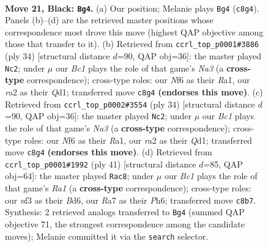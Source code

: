 \documentclass[11pt]{article}
\begin{document}
\clearpage

\begin{figure}[p]\centering
\begin{subfigure}{0.46\textwidth}\centering
\resizebox{\linewidth}{!}{%
\newchessgame
\chessboard[
  setfen={2b1r1k1/r3qpp1/np1p1n2/4p2p/P1B1P3/2N2NP1/R1PQ1P1P/2R3K1 b - - 4 21},
  showmover=false,
  pgfstyle=straightmove, color=movearrow, markmove={c8-g4}
]}
\caption{}
\end{subfigure}\hfill
\begin{subfigure}{0.46\textwidth}\centering
\resizebox{\linewidth}{!}{%
\newchessgame
\chessboard[
  setfen={r2qr1k1/4nppp/pp3n2/3p4/2PP4/NP3N1P/5PP1/R2QR1K1 w - - 0 18},
  showmover=false,
  pgfstyle=straightmove, color=movearrow, markmove={a3-c2}
]}
\caption{}
\end{subfigure}
\\[4pt]
\begin{subfigure}{0.46\textwidth}\centering
\resizebox{\linewidth}{!}{%
\newchessgame
\chessboard[
  setfen={r2qr1k1/4nppp/pp3n2/3p4/2PP4/NP3N1P/5PP1/R2QR1K1 w - - 0 18},
  showmover=false,
  pgfstyle=straightmove, color=movearrow, markmove={a3-c2}
]}
\caption{}
\end{subfigure}\hfill
\begin{subfigure}{0.46\textwidth}\centering
\resizebox{\linewidth}{!}{%
\newchessgame
\chessboard[
  setfen={r2rq1k1/1p3pp1/p1nb1n1p/4p3/1P2P3/PQ3N1P/1B1N1PP1/2R1R1K1 b - - 7 21},
  showmover=false,
  pgfstyle=straightmove, color=movearrow, markmove={a8-c8}
]}
\caption{}
\end{subfigure}
\caption{\textbf{Move 21, Black: \texttt{Bg4}.} (a) Our position; Melanie plays \texttt{Bg4} (\texttt{c8g4}). Panels (b)--(d) are the retrieved master positions whose correspondence most drove this move (highest QAP objective among those that transfer to it). (b) Retrieved from \texttt{ccrl\_top\_p0001\#3886} (ply 34) [structural distance $d$=90, QAP obj=36]: the master played \texttt{Nc2}; under $\mu$ our \emph{Bc1} plays the role of that game's \emph{Na3} (a \textbf{cross-type} correspondence); cross-type roles: our \emph{N}f6 as their \emph{R}a1, our \emph{r}a2 as their \emph{Q}d1; transferred move \texttt{c8g4} \textbf{(endorses this move)}. (c) Retrieved from \texttt{ccrl\_top\_p0002\#3554} (ply 34) [structural distance $d$=90, QAP obj=36]: the master played \texttt{Nc2}; under $\mu$ our \emph{Bc1} plays the role of that game's \emph{Na3} (a \textbf{cross-type} correspondence); cross-type roles: our \emph{N}f6 as their \emph{R}a1, our \emph{r}a2 as their \emph{Q}d1; transferred move \texttt{c8g4} \textbf{(endorses this move)}. (d) Retrieved from \texttt{ccrl\_top\_p0001\#1992} (ply 41) [structural distance $d$=85, QAP obj=64]: the master played \texttt{Rac8}; under $\mu$ our \emph{Bc1} plays the role of that game's \emph{Ra1} (a \textbf{cross-type} correspondence); cross-type roles: our \emph{n}f3 as their \emph{B}d6, our \emph{R}a7 as their \emph{P}h6; transferred move \texttt{c8b7}. Synthesis: 2 retrieved analogs transferred to \texttt{Bg4} (summed QAP objective 71, the strongest correspondence among the candidate moves); Melanie committed it via the \texttt{search} selector.}
\label{fig:thought-m41}
\end{figure}
\end{document}
